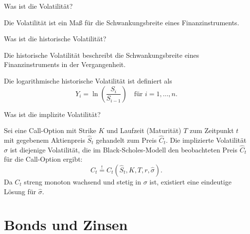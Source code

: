 \begin{QandA}
    \item Was ist die Volatilität?
    \begin{answered}
        Die Volatilität ist ein Maß für die Schwankungsbreite eines Finanzinstruments.
    \end{answered}

    \item Was ist die historische Volatilität?
    \begin{answered}
        Die historische Volatilität beschreibt die Schwankungsbreite eines Finanzinstruments in der Vergangenheit.

        Die logarithmische historische Volatilität ist definiert als
        \[
            Y_i = \ln\left(\frac{S_i}{S_{i-1}}\right) \quad \text{für } i = 1, \ldots, n.
        \]
    \end{answered}

    \item Was ist die implizite Volatilität?
    \begin{answered}
        Sei eine Call-Option mit Strike $K$ und Laufzeit (Maturität) $T$ zum Zeitpunkt $t$ mit gegebenem Aktienpreis $\hat{S}_t$ gehandelt zum Preis $\hat{C}_t$.
        Die implizierte Volatilität $\hat{\sigma}$ ist diejenige Volatilität, die im Black-Scholes-Modell den beobachteten Preis $\hat{C}_t$ für die Call-Option ergibt:
        \[
            \hat{C}_t \stackrel{!}{=} C_t(\hat{S}_t, K, T, r, \hat{\sigma}).
        \]
        Da $C_t$ streng monoton wachsend und stetig in $\sigma$ ist, existiert eine eindeutige Lösung für $\hat{\sigma}$.
    \end{answered}
\end{QandA}

\newpage
\section*{Bonds und Zinsen}


